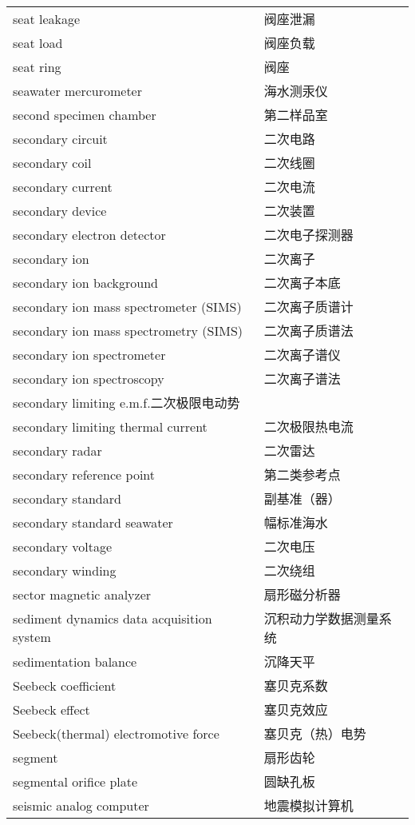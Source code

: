 \documentclass[
]{article}
\begin{document}
\begin{longtable}[]{@{}ll@{}}
seat leakage & 阀座泄漏 \\
seat load & 阀座负载 \\
seat ring & 阀座 \\
seawater mercurometer & 海水测汞仪 \\
second specimen chamber & 第二样品室 \\
secondary circuit & 二次电路 \\
secondary coil & 二次线圈 \\
secondary current & 二次电流 \\
secondary device & 二次装置 \\
secondary electron detector & 二次电子探测器 \\
secondary ion & 二次离子 \\
secondary ion background & 二次离子本底 \\
secondary ion mass spectrometer (SIMS) & 二次离子质谱计 \\
secondary ion mass spectrometry (SIMS) & 二次离子质谱法 \\
secondary ion spectrometer & 二次离子谱仪 \\
secondary ion spectroscopy & 二次离子谱法 \\
secondary limiting e.m.f.二次极限电动势 & \\
secondary limiting thermal current & 二次极限热电流 \\
secondary radar & 二次雷达 \\
secondary reference point & 第二类参考点 \\
secondary standard & 副基准（器） \\
secondary standard seawater & 幅标准海水 \\
secondary voltage & 二次电压 \\
secondary winding & 二次绕组 \\
sector magnetic analyzer & 扇形磁分析器 \\
sediment dynamics data acquisition system & 沉积动力学数据测量系统 \\
sedimentation balance & 沉降天平 \\
Seebeck coefficient & 塞贝克系数 \\
Seebeck effect & 塞贝克效应 \\
Seebeck(thermal) electromotive force & 塞贝克（热）电势 \\
segment & 扇形齿轮 \\
segmental orifice plate & 圆缺孔板 \\
seismic analog computer & 地震模拟计算机 \\

\end{longtable}
\end{document}
